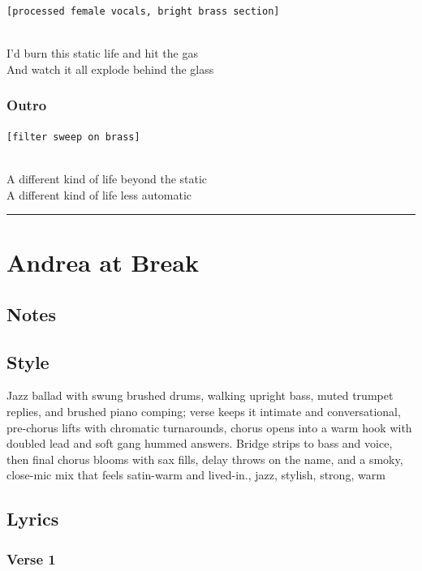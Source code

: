 \documentclass[]{article}
\begin{document}
\texttt{{[}processed\ female\ vocals,\ bright\ brass\ section{]}}\strut \\
I'd burn this static life and hit the gas\\
And watch it all explode behind the glass

\subsubsection{Outro}\label{outro-2}

\texttt{{[}filter\ sweep\ on\ brass{]}}\strut \\
A different kind of life beyond the static\\
A different kind of life less automatic

\begin{center}\rule{0.5\linewidth}{0.5pt}\end{center}

\section{Andrea at Break}\label{andrea-at-break}

\subsection{Notes}\label{notes-16}

\subsection{Style}\label{style-16}

Jazz ballad with swung brushed drums, walking upright bass, muted
trumpet replies, and brushed piano comping; verse keeps it intimate and
conversational, pre-chorus lifts with chromatic turnarounds, chorus
opens into a warm hook with doubled lead and soft gang hummed answers.
Bridge strips to bass and voice, then final chorus blooms with sax
fills, delay throws on the name, and a smoky, close-mic mix that feels
satin-warm and lived-in., jazz, stylish, strong, warm

\subsection{Lyrics}\label{lyrics-16}

\subsubsection{Verse 1}\label{verse-1-9}
\end{document}
